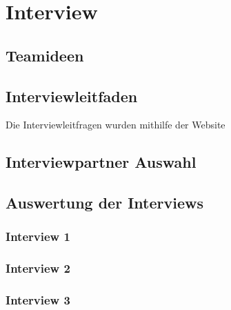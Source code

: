 
\chapter{Interview}

\section{Teamideen}

\section{Interviewleitfaden}

Die Interviewleitfragen wurden mithilfe der Website \cite{Schluesselqualifikationen}


\section{Interviewpartner Auswahl}

\section{Auswertung der Interviews}

\subsection{Interview 1}

\subsection{Interview 2}

\subsection{Interview 3}
